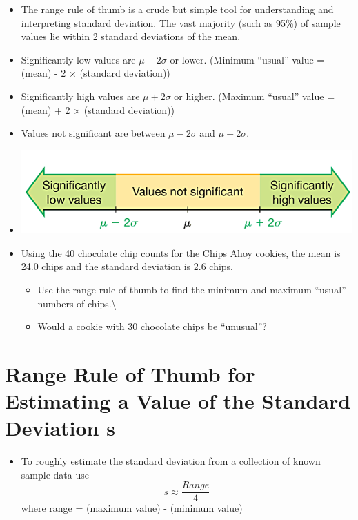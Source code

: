 \documentclass[]{book}
\providecommand{\tightlist}{%
  \setlength{\itemsep}{0pt}\setlength{\parskip}{0pt}}
\begin{document}
\begin{itemize}
\tightlist
\item
  The range rule of thumb is a crude but simple tool for understanding and interpreting standard deviation. The vast majority (such as 95\%) of sample values lie within 2 standard deviations of the mean.
\item
  Significantly low values are \(\mu-2\sigma\) or lower. (Minimum ``usual'' value = (mean) - 2 \(\times\) (standard deviation))
\item
  Significantly high values are \(\mu+2\sigma\) or higher. (Maximum ``usual'' value = (mean) + 2 \(\times\) (standard deviation))
\item
  Values not significant are between \(\mu-2\sigma\) and \(\mu+2\sigma\).
\item
  \includegraphics{pic9.png}
\item
  Using the 40 chocolate chip counts for the Chips Ahoy cookies, the mean is 24.0 chips and the standard deviation is 2.6 chips.

  \begin{itemize}
  \tightlist
  \item
    Use the range rule of thumb to find the minimum and maximum ``usual'' numbers of chips.\textbackslash{}
  \item
    Would a cookie with 30 chocolate chips be ``unusual''?
  \end{itemize}
\end{itemize}

\hypertarget{range-rule-of-thumb-for-estimating-a-value-of-the-standard-deviation-s}{%
\section{Range Rule of Thumb for Estimating a Value of the Standard Deviation s}\label{range-rule-of-thumb-for-estimating-a-value-of-the-standard-deviation-s}}

\begin{itemize}
\tightlist
\item
  To roughly estimate the standard deviation from a collection of known sample data use
  \[s\approx \frac{Range}{4}\]
  where range = (maximum value) - (minimum value)
\end{itemize}
\end{document}
